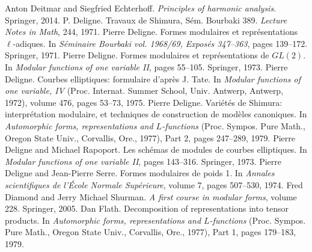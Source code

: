 \begin{references}
 Anton Deitmar and Siegfried Echterhoff. \emph{Principles of harmonic analysis}. Springer, 2014.
 P. Deligne. Travaux de Shimura, Sém. Bourbaki 389. \emph{Lecture Notes in Math}, 244, 1971.
 Pierre Deligne. Formes modulaires et représentations $\ell$-adiques. In \emph{Séminaire Bourbaki vol. 1968/69, Exposés 347--363}, pages 139--172. Springer, 1971.
 Pierre Deligne. Formes modulaires et représentations de $GL(2)$. In \emph{Modular functions of one variable II}, pages 55--105. Springer, 1973.
 Pierre Deligne. Courbes elliptiques: formulaire d'après J. Tate. In \emph{Modular functions of one variable, IV} (Proc. Internat. Summer School, Univ. Antwerp, Antwerp, 1972), volume 476, pages 53--73, 1975.
 Pierre Deligne. Variétés de Shimura: interprétation modulaire, et techniques de construction de modèles canoniques. In \emph{Automorphic forms, representations and $L$-functions} (Proc. Sympos. Pure Math., Oregon State Univ., Corvallis, Ore., 1977), Part 2, pages 247--289, 1979.
 Pierre Deligne and Michael Rapoport. Les schémas de modules de courbes elliptiques. In \emph{Modular functions of one variable II}, pages 143--316. Springer, 1973.
 Pierre Deligne and Jean-Pierre Serre. Formes modulaires de poids 1. In \emph{Annales scientifiques de l'École Normale Supérieure}, volume 7, pages 507--530, 1974.
 Fred Diamond and Jerry Michael Shurman. \emph{A first course in modular forms}, volume 228. Springer, 2005.
 Dan Flath. Decomposition of representations into tensor products. In \emph{Automorphic forms, representations and $L$-functions} (Proc. Sympos. Pure Math., Oregon State Univ., Corvallis, Ore., 1977), Part 1, pages 179--183, 1979.


\end{references}
